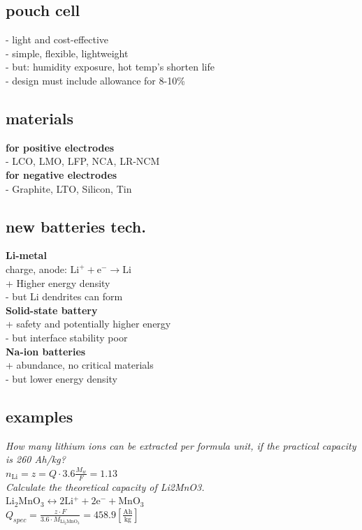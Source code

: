 \documentclass[a4paper,10pt,landscape]{scrartcl}
\begin{document}
\begin{multicols*}{3}
\subsection{pouch cell}
- light and cost-effective \\
- simple, flexible, lightweight \\
- but: humidity exposure, hot temp's shorten life \\
- design must include allowance for 8-10\%
\subsection{materials}
\textbf{for positive electrodes} \\
- LCO, LMO, LFP, NCA, LR-NCM \\
\textbf{for negative electrodes} \\
- Graphite, LTO, Silicon, Tin

\subsection{new batteries tech.}
\textbf{Li-metal} \\
charge, anode: $\mathrm{Li^+ + e^-\rightarrow Li}$ \\
+ Higher energy density  \\
- but Li dendrites can form \\
\textbf{Solid-state battery} \\
+ safety and potentially higher energy\\
- but interface stability poor \\
\textbf{Na-ion batteries} \\
+ abundance, no critical materials\\
- but lower energy density

\subsection{examples}
\textit{How many lithium ions can be extracted per formula unit, if the practical capacity is 260 Ah/kg?} \\
$n_\mathrm{Li}=z=Q\cdot3.6\frac{M_w}{F} = 1.13$ \\
\textit{Calculate the theoretical capacity of Li2MnO3.} \\
$\mathrm{Li_2MnO_3 \leftrightarrow 2Li^+ + 2e^- + MnO_3}$ \\
$Q_{spec}=\frac{z\cdot F}{3.6\cdot M_\mathrm{Li_2MnO_3}}=458.9 \left[\mathrm{\frac{Ah}{kg}}\right]$


\end{multicols*}
\end{document}
